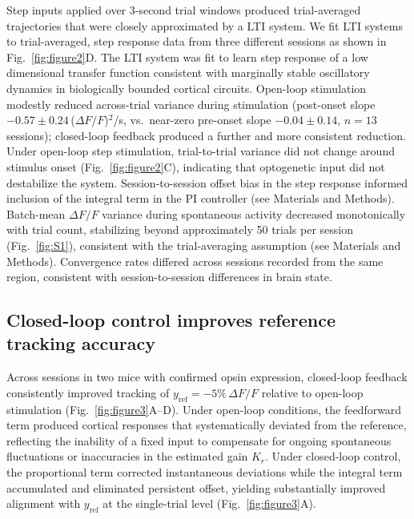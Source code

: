 Step inputs applied over 3-second trial windows produced trial-averaged trajectories that were closely approximated by a LTI system. We fit LTI systems to trial-averaged, step response data from three different sessions as shown in Fig.~\ref{fig:figure2}D. The LTI system was fit to learn step response of a low dimensional transfer function 
consistent with marginally stable oscillatory dynamics in biologically bounded cortical circuits. 
Open-loop stimulation modestly reduced across-trial variance during stimulation (post-onset slope $-0.57 \pm 0.24$\,($\Delta F/F$)$^2$/s, vs.\ near-zero pre-onset slope $-0.04 \pm 0.14$, $n=13$ sessions); closed-loop feedback produced a further and more consistent reduction. Under open-loop step stimulation, trial-to-trial variance did not change around stimulus onset (Fig.~\ref{fig:figure2}C), indicating that optogenetic input did not destabilize the system.
Session-to-session offset bias in the step response informed inclusion of the integral term in the PI controller (see Materials and Methods).
Batch-mean $\Delta F/F$ variance during spontaneous activity decreased monotonically with trial count, stabilizing beyond approximately 50 trials per session (Fig.~\ref{fig:S1}), consistent with the trial-averaging assumption (see Materials and Methods). 
Convergence rates differed across sessions recorded from the same region, consistent with session-to-session differences in brain state.

\subsection*{Closed-loop control improves reference tracking accuracy}

Across sessions in  two mice with confirmed opsin expression, closed-loop feedback consistently improved tracking of $y_{\mathrm{ref}} = -5\%\,\Delta F/F$ relative to open-loop stimulation (Fig.~\ref{fig:figure3}A--D). 
Under open-loop conditions, the feedforward term produced cortical responses that systematically deviated from the reference, reflecting the inability of a fixed input to compensate for ongoing spontaneous fluctuations or inaccuracies in the estimated gain $K_{r}$.
Under closed-loop control, the proportional term corrected instantaneous deviations while the integral term accumulated and eliminated persistent offset, yielding substantially improved alignment with $y_{\mathrm{ref}}$ at the single-trial level (Fig.~\ref{fig:figure3}A).



